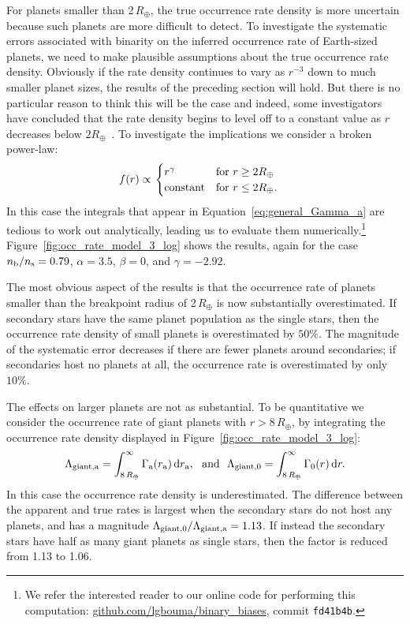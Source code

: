 \documentclass[12pt,modern]{aastex61}
\renewcommand{\a}{_{\rm a}}
\newcommand{\s}{_{\rm s}}
\renewcommand{\b}{_{\rm b}}
\begin{document}
For planets smaller than 2\,$R_\oplus$, the true occurrence rate
density is more uncertain because such planets are more difficult to
detect.  To investigate the systematic errors associated with binarity
on the inferred occurrence rate of Earth-sized planets, we need to
make plausible assumptions about the true occurrence rate density.
Obviously if the rate density continues to vary as $r^{-3}$ down to
much smaller planet sizes, the results of the preceding section will
hold.  But there is no particular reason to think this will be the
case and indeed, some investigators have concluded that the rate
density begins to level off to a constant value as $r$ decreases below
$2R_\oplus$~\citep{petigura_plateau_2013}.  To investigate the
implications we consider a broken power-law:
\begin{align}
    f(r)
    &\propto
    \left.
    \begin{cases}
        r^\gamma & \text{for } r\geq 2R_\oplus \\
        {\rm constant} & \text{for } r\leq2R_\oplus.
    \end{cases}
    \right.
    \label{eq:model3_radius_distribution}
\end{align}
In this case the integrals that appear in
Equation~\ref{eq:general_Gamma_a} are tedious to work out
analytically, leading us to evaluate them numerically.\footnote{We
refer the interested reader to our online code for performing this
computation: \url{github.com/lgbouma/binary_biases}, commit
\texttt{fd41b4b}.} Figure~\ref{fig:occ_rate_model_3_log} shows the
results, again for the case $n\b/n\s=0.79$, $\alpha = 3.5$, $\beta=0$,
and $\gamma=-2.92$.

The most obvious aspect of the results is that the occurrence rate of
planets smaller than the breakpoint radius of 2\,$R_\oplus$ is now
substantially overestimated.  If secondary stars have the same planet
population as the single stars, then the occurrence rate density of
small planets is overestimated by $50\%$.  The magnitude of the
systematic error decreases if there are fewer planets around
secondaries; if secondaries host no planets at all, the occurrence
rate is overestimated by only $10\%$.

The effects on larger planets are not as substantial.  To be
quantitative we consider the occurrence rate of giant planets with
$r>8\,R_\oplus$, by integrating the occurrence rate density displayed
in Figure~\ref{fig:occ_rate_model_3_log}:
\begin{equation}
    \Lambda_{\rm giant,a} =
      \int_{8\,R_\oplus}^{\infty} \Gamma\a(r\a)\,{\rm d}r\a,~~{\rm
      and}~~
    \Lambda_{\rm giant,0} =
      \int_{8\,R_\oplus}^{\infty} \Gamma_0(r)\,{\rm d}r.
\end{equation}
In this case the occurrence rate density is underestimated.  The
difference between the apparent and true rates is largest when the
secondary stars do not host any planets, and has a magnitude
$\Lambda_{{\rm giant},0}/\Lambda_{\rm giant,a} = 1.13$.
If instead the secondary stars have half as many giant planets as single
stars, then the factor is reduced from 1.13 to 1.06.
\end{document}
